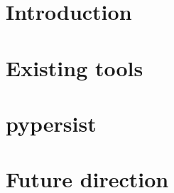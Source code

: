 \documentclass{deliverablereport}
\author{Author names}
\begin{document}
\maketitle
\githubissuedescription


\section{Introduction}
\label{sec:intro}

\section{Existing tools}
\label{sec:existing}

\section{pypersist}
\label{sec:pypersist}

\section{Future direction}
\label{sec:future}
\end{document}

